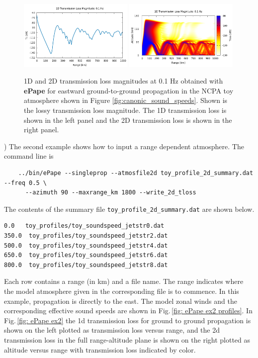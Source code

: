 \begin{figure}[h]
\begin{center}
\includegraphics[width=0.49\textwidth]{figs/ePape_ex1_1d}
\includegraphics[width=0.49\textwidth]{figs/ePape_ex1_2d}
\end{center}
\caption{1D and 2D transmission loss magnitudes at 0.1 Hz obtained with {\bf ePape} for eastward ground-to-ground propagation in the NCPA toy atmosphere shown in Figure \ref{fig:canonic_sound_speeds}. Shown is the lossy transmission loss magnitude. The 1D transmission loss is shown in the left panel and the 2D transmission loss is shown in the right panel.}
\label{fig: ePape ex1}
\end{figure}

) The second example shows how to input a range dependent atmosphere. The command line is 
\begin{verbatim}
    ../bin/ePape --singleprop --atmosfile2d toy_profile_2d_summary.dat --freq 0.5 \
      --azimuth 90 --maxrange_km 1800 --write_2d_tloss
\end{verbatim}
The contents of the summary file \verb+toy_profile_2d_summary.dat+ are shown below. 
\begin{verbatim}
0.0   toy_profiles/toy_soundspeed_jetstr0.dat
350.0  toy_profiles/toy_soundspeed_jetstr2.dat
500.0  toy_profiles/toy_soundspeed_jetstr4.dat
650.0  toy_profiles/toy_soundspeed_jetstr6.dat
800.0  toy_profiles/toy_soundspeed_jetstr8.dat
\end{verbatim}
Each row contains a range (in km) and a file name. The range indicates where the model atmosphere given in the corresponding file is to commence. In this example, propagation is directly to the east. The model zonal winds and the corresponding effective sound speeds are shown in Fig.\,\ref{fig: ePape ex2 profiles}. In Fig.\,\ref{fig: ePape ex2} the 1d transmission loss for ground to ground propagation is shown on the left plotted as transmission loss versus range, and the 2d transmission loss in the full range-altitude plane is shown on the right plotted as altitude versus range with transmission loss indicated by color. 

